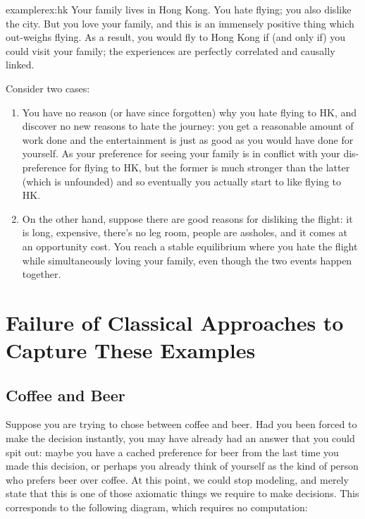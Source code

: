 \documentclass{article}
\begin{document}
	\begin{restatable}{example}{rex:hk} \label{rex:hk}
		Your family lives in Hong Kong. You hate flying; you also dislike the city. But you love your family, and this is an immensely positive thing which out-weighs flying. As a result, you would fly to Hong Kong if (and only if) you could visit your family; the experiences are perfectly correlated and causally linked.
		
		Consider two cases:
		\begin{enumerate}[nosep]
			\item You have no reason (or have since forgotten) why you hate flying to HK, and discover no new reasons to hate the journey: you get a reasonable amount of work done and the entertainment is just as good as you would have done for yourself. As your preference for seeing your family is in conflict with your dis-preference for flying to HK, but the former is much stronger than the latter (which is unfounded) and so eventually you actually start to like flying to HK.
			\item On the other hand, suppose there are good reasons for disliking the flight: it is long, expensive, there's no leg room, people are assholes, and it comes at an opportunity cost. You reach a stable equilibrium where you hate the flight while simultaneously loving your family, even though the two events happen together.
		\end{enumerate}
	\end{restatable}

	
					

	\section{Failure of Classical Approaches to Capture These Examples}
	\subsection{Coffee and Beer}
	Suppose you are trying to chose between coffee and beer. Had you been forced to make the decision instantly, you may have already had an answer that you could spit out: maybe you have a cached preference for beer from the last time you made this decision, or perhaps you already think of yourself as the kind of person who prefers beer over coffee. At this point, we could stop modeling, and merely state that this is one of those axiomatic things we require to make decisions. This corresponds to the following diagram, which requires no computation:
	\begin{center}
	\end{center}
	
\end{document}
